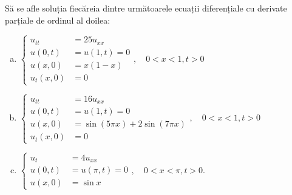 Să se afle soluția fiecăreia dintre următoarele ecuații diferențiale cu
derivate parțiale de ordinul al doilea:
\begin{enumerate}[(a)]
\item $ \begin{cases}
    u_{tt} &= 25 u_{xx} \\
    u(0, t) &= u(1, t) = 0 \\
    u(x, 0) &= x(1 - x) \\
    u_t(x, 0) &= 0 
  \end{cases}, \quad 0 < x < 1, t > 0 $
\item $ \begin{cases}
    u_{tt} &= 16 u_{xx} \\
    u(0, t) &= u(1, t) = 0 \\
    u(x, 0) &= \sin(5 \pi x) + 2 \sin(7 \pi x) \\
    u_t(x, 0) &= 0 
  \end{cases}, \quad 0 < x < 1, t > 0 $
\item $ \begin{cases}
    u_t &= 4 u_{xx} \\
    u(0, t) &= u(\pi, t) = 0 \\
    u(x, 0) &= \sin x
  \end{cases}, \quad 0 < x < \pi, t > 0 $.
\end{enumerate}




